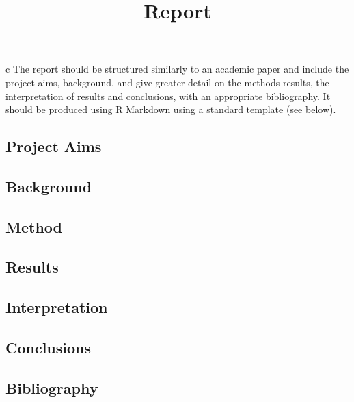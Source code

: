 \documentclass[]{ametsoc}
\title{Report}
\begin{document}
\maketitle
c The report should be structured similarly to an academic paper and
include the project aims, background, and give greater detail on the
methods results, the interpretation of results and conclusions, with an
appropriate bibliography. It should be produced using R Markdown using a
standard template (see below).

\subsection{Project Aims}\label{project-aims}

\subsection{Background}\label{background}

\subsection{Method}\label{method}

\subsection{Results}\label{results}

\subsection{Interpretation}\label{interpretation}

\subsection{Conclusions}\label{conclusions}

\subsection{Bibliography}\label{bibliography}
\end{document}
